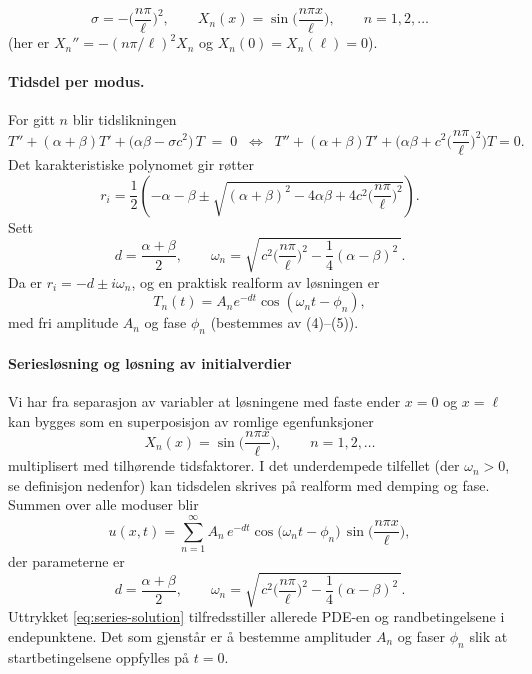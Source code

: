 \[
\sigma = -\Big(\frac{n\pi}{\ell}\Big)^2, \qquad
X_n(x)=\sin\!\Big(\frac{n\pi x}{\ell}\Big), \qquad n=1,2,\dots
\]
(her er $X_n''=-(n\pi/\ell)^2 X_n$ og $X_n(0)=X_n(\ell)=0$).

\paragraph{Tidsdel per modus.}
For gitt $n$ blir tidslikningen
\[
T'' + (\alpha+\beta)T' + \big(\alpha\beta - \sigma c^2\big)\,T \;=\; 0
\;\;\Longleftrightarrow\;\;
T'' + (\alpha+\beta)T' + \Big(\alpha\beta + c^2\Big(\frac{n\pi}{\ell}\Big)^2\Big)T = 0.
\]
Det karakteristiske polynomet gir røtter
\[
r_i = \frac{1}{2}\!\left(-\alpha-\beta \pm \sqrt{(\alpha+\beta)^2 - 4\alpha\beta + 4c^2\Big(\frac{n\pi}{\ell}\Big)^2}\right).
\]
Sett
\[
d=\frac{\alpha+\beta}{2}, \qquad
\omega_n = \sqrt{\,c^2\Big(\frac{n\pi}{\ell}\Big)^2 - \frac{1}{4}(\alpha-\beta)^2\,}.
\]
Da er $r_i=-d\pm i\omega_n$, og en praktisk realform av løsningen er
\[
T_n(t)=A_n e^{-dt}\cos(\omega_n t - \phi_n),
\]
med fri amplitude $A_n$ og fase $\phi_n$ (bestemmes av (4)--(5)).




\paragraph{Seriesløsning og løsning av initialverdier}

Vi har fra separasjon av variabler at løsningene med faste ender $x=0$ og $x=\ell$ kan bygges som en superposisjon av romlige egenfunksjoner
\[
X_n(x)=\sin\!\Big(\frac{n\pi x}{\ell}\Big),\qquad n=1,2,\dots
\]
multiplisert med tilhørende tidsfaktorer. I det underdempede tilfellet (der \(\omega_n>0\), se definisjon nedenfor) kan tidsdelen skrives på realform med demping og fase. Summen over alle moduser blir
\begin{equation}\label{eq:series-solution}
u(x,t)=\sum_{n=1}^{\infty} A_n\,e^{-dt}\cos\!\big(\omega_n t-\phi_n\big)\,
\sin\!\Big(\frac{n\pi x}{\ell}\Big),
\end{equation}
der parameterne er
\[
d=\frac{\alpha+\beta}{2},\qquad
\omega_n=\sqrt{\,c^2\Big(\frac{n\pi}{\ell}\Big)^2-\frac{1}{4}(\alpha-\beta)^2\,}.
\]
Uttrykket \eqref{eq:series-solution} tilfredsstiller allerede PDE-en og randbetingelsene i endepunktene. Det som gjenstår er å bestemme amplituder $A_n$ og faser $\phi_n$ slik at startbetingelsene oppfylles på $t=0$.

